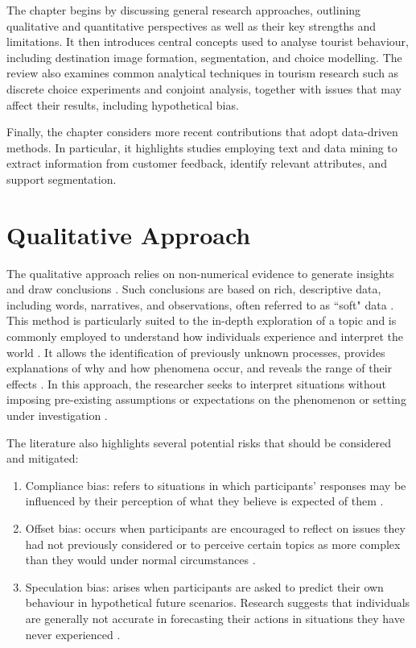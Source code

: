 \documentclass[a4paper, 12pt, twoside]{report}  %
\begin{document}
\indent The chapter begins by discussing general research approaches, outlining qualitative and quantitative perspectives as well as their key strengths and limitations. It then introduces central concepts used to analyse tourist behaviour, including destination image formation, segmentation, and choice modelling. The review also examines common analytical techniques in tourism research such as discrete choice experiments and conjoint analysis, together with issues that may affect their results, including hypothetical bias.

\indent Finally, the chapter considers more recent contributions that adopt data-driven methods. In particular, it highlights studies employing text and data mining to extract information from customer feedback, identify relevant attributes, and support segmentation.

\section{Qualitative Approach}

\indent The qualitative approach relies on non-numerical evidence to generate insights and draw conclusions \cite{finnetal}. Such conclusions are based on rich, descriptive data, including words, narratives, and observations, often referred to as ``soft" data \cite{mcdowell}. This method is particularly suited to the in-depth exploration of a topic and is commonly employed to understand how individuals experience and interpret the world \cite{scribbr}. It allows the identification of previously unknown processes, provides explanations of why and how phenomena occur, and reveals the range of their effects \cite{creswelletal}. In this approach, the researcher seeks to interpret situations without imposing pre-existing assumptions or expectations on the phenomenon or setting under investigation \cite{amaratunga}. 

\indent The literature also highlights several potential risks that should be considered and mitigated:

\begin{enumerate}
    \item Compliance bias: refers to situations in which participants’ responses may be influenced by their perception of what they believe is expected of them \cite{massimo}.
    \item Offset bias: occurs when participants are encouraged to reflect on issues they had not previously considered or to perceive certain topics as more complex than they would under normal circumstances \cite{massimo}.
    \item Speculation bias: arises when participants are asked to predict their own behaviour in hypothetical future scenarios. Research suggests that individuals are generally not accurate in forecasting their actions in situations they have never experienced \cite{massimo}.
\end{enumerate}
\end{document}
